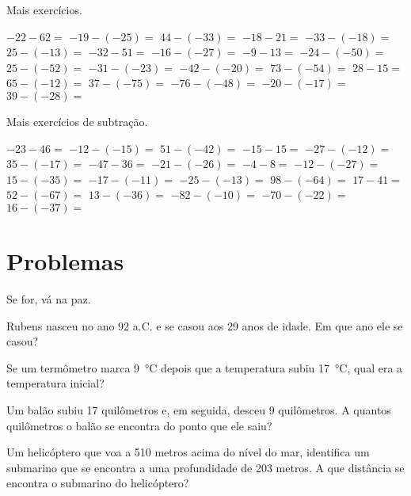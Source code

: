 \begin{questions}
\begin{choices}
\end{choices}


\question Mais exercícios.

\begin{choices}
	
	\choice $-22 - 62=$
	\choice $-19 - (-25)=$
	\choice $44 - (-33)=$
	\choice $-18 - 21=$
	\choice $-33 - (-18)=$
	\choice $25 - (-13)=$
	\choice $-32 - 51=$
	\choice $-16 - (-27)=$
	\choice $-9 - 13=$
	\choice $-24 - (-50)=$
	\choice $25 - (-52)=$
	\choice $-31 - (-23)=$
	\choice $-42 - (-20)=$
	\choice $73 - (-54)=$
	\choice $28 - 15=$
	\choice $65 - (-12)=$
	\choice $37 - (-75)=$
	\choice $-76 - (-48)=$
	\choice $-20 - (-17)=$
	\choice $39 - (-28)=$
	
\end{choices}


\question Mais exercícios de subtração.

\begin{choices}
	
	\choice $-23 - 46=$
	\choice $-12 - (-15)=$
	\choice $51 - (-42)=$
	\choice $-15 - 15=$
	\choice $-27 - (-12)=$
	\choice $35 - (-17)=$
	\choice $-47 - 36=$
	\choice $-21 - (-26)=$
	\choice $-4 - 8=$
	\choice $-12 - (-27)=$
	\choice $15 - (-35)=$
	\choice $-17 - (-11)=$
	\choice $-25 - (-13)=$
	\choice $98 - (-64)=$
	\choice $17 - 41=$
	\choice $52 - (-67)=$
	\choice $13 - (-36)=$
	\choice $-82 - (-10)=$
	\choice $-70 - (-22)=$
	\choice $16 - (-37)=$
	
\end{choices}

\section{Problemas}
	
	Se for, vá na paz.

\question Rubens nasceu no ano 92 a.C. e se casou aos 29 anos de idade. Em que ano ele se casou?

\question Se um termômetro marca \SI{9}{\celsius} depois que a temperatura subiu \SI{17}{\celsius}, qual era a temperatura inicial?

\question Um balão subiu 17 quilômetros e, em seguida, desceu 9 quilômetros. A quantos quilômetros o balão se encontra do ponto que ele saiu?

\question Um helicóptero que voa a 510 metros acima do nível do mar, identifica um submarino que se encontra a uma profundidade de 203 metros. A que distância se encontra o submarino do helicóptero?


\end{questions}
